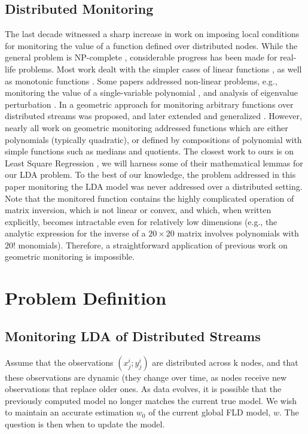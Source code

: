 \documentclass[11pt,twocolumn,varwidth=true,a4paper,fleqn]{article}
\begin{document}
\subsection{Distributed Monitoring}
The last decade witnessed a sharp increase in work on imposing local conditions for monitoring the value of a function
defined over distributed nodes. While the general problem is NP-complete
\cite{keren2014geometric}, considerable progress has been made for real-life problems. Most work dealt with the simpler cases of
linear functions \cite{keralapura2006communication, kashyap2008efficient}, as well as monotonic
functions \cite{michel2005klee}.
Some papers addressed non-linear problems, e.g., monitoring
the value of a single-variable polynomial \cite{shah2008handling}, and analysis
of eigenvalue perturbation \cite{huang2007communication}. 
In \cite{sharfman2007geometric} a geometric approach for monitoring arbitrary functions over distributed
streams was proposed, and later extended and generalized
\cite{keren2012shape,lazerson2015monitoring}. However, nearly all work on geometric monitoring addressed
functions which are either polynomials (typically quadratic), or defined by
compositions of polynomial with simple functions such as medians and quotients. 
The closest work to ours is on Least Square Regression
\cite{gabel2015monitoring}, we will harness some of their mathematical lemmas
for our LDA problem. To the best of our knowledge, the problem addressed in this
paper monitoring the LDA model was never addressed over a distributed setting. Note
that the monitored function contains the highly complicated
operation of matrix inversion, which is not linear or convex,
and which, when written explicitly, becomes intractable even
for relatively low dimensions (e.g., the analytic expression
for the inverse of a $20 \times 20$ matrix involves polynomials with
$20!$ monomials). Therefore, a straightforward application of
previous work on geometric monitoring is impossible.

\section{Problem Definition}
\subsection{Monitoring LDA of Distributed Streams}
Assume that the observations ${(x^i_j; y^i_j)}$ are distributed across k nodes, and that these observations are dynamic (they change over time, as nodes receive new observations that replace older ones. As data evolves, it is possible that the
previously computed model no longer matches the current true model. We wish to maintain an accurate estimation $w_0$ of the current global FLD model, $w$. The question is then when to update the model.
\end{document}
